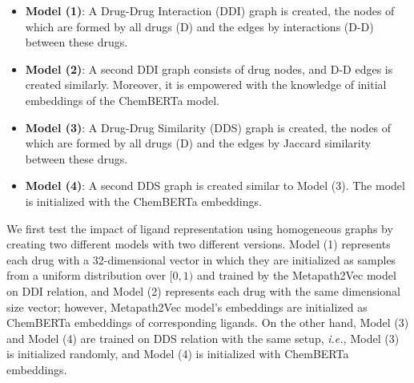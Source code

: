 \newpage
\begin{itemize}
    \item \textbf{Model (1)}: A Drug-Drug Interaction (DDI) graph is created, the nodes of which are formed by all drugs (D) and the edges by interactions (D-D) between these drugs.   
    \item \textbf{Model (2)}: A second DDI graph consists of drug nodes, and D-D edges is created similarly. Moreover, it is empowered with the knowledge of initial embeddings of the ChemBERTa model.
    \item \textbf{Model (3)}: A Drug-Drug Similarity (DDS) graph is created, the nodes of which are formed by all drugs (D) and the edges by Jaccard similarity between these drugs. 
    \item \textbf{Model (4)}: A second DDS graph is created similar to Model (3). The model is initialized with the ChemBERTa embeddings.
\end{itemize}

We first test the impact of ligand representation using homogeneous graphs by creating two different models with two different versions. Model (1) represents each drug with a 32-dimensional vector in which they are initialized as samples from a uniform distribution over $[0, 1)$ and trained by the Metapath2Vec model on DDI relation, and Model (2) represents each drug with the same dimensional size vector; however, Metapath2Vec model's embeddings are initialized as ChemBERTa embeddings of corresponding ligands. On the other hand, Model (3) and Model (4) are trained on DDS relation with the same setup, \textit{i.e.,} Model (3) is initialized randomly, and Model (4) is initialized with ChemBERTa embeddings.



